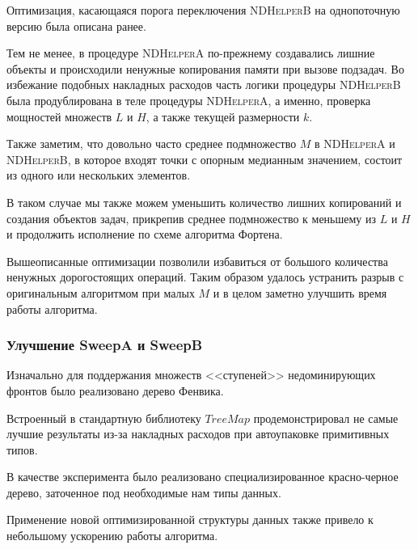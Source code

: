 Оптимизация, касающаяся порога переключения \textsc{NDHelperB} на однопоточную версию была описана ранее.

Тем не менее, в процедуре \textsc{NDHelperA} по-прежнему создавались лишние объекты и происходили ненужные копирования памяти при вызове подзадач.
Во избежание подобных накладных расходов часть логики процедуры \textsc{NDHelperB} была продублирована в теле процедуры \textsc{NDHelperA}, а именно, проверка мощностей множеств $L$ и $H$, а также текущей размерности $k$.

Также заметим, что довольно часто среднее подмножество $M$ в \textsc{NDHelperA} и \textsc{NDHelperB}, в которое входят точки с опорным медианным значением, состоит из одного или нескольких элементов. 

В таком случае мы также можем уменьшить количество лишних копирований и создания объектов задач, прикрепив среднее подмножество к меньшему из $L$ и $H$ и продолжить исполнение по схеме алгоритма Фортена.

Вышеописанные оптимизации позволили избавиться от большого количества ненужных дорогостоящих операций.
Таким образом удалось устранить разрыв с оригинальным алгоритмом при малых $M$ и в целом заметно улучшить время работы алгоритма.

\subsubsection{Улучшение SweepA и SweepB}
Изначально для поддержания множеств <<ступеней>> недоминирующих фронтов было реализовано дерево Фенвика.

Встроенный в стандартную библиотеку $TreeMap$ продемонстрировал не самые лучшие результаты из-за накладных расходов при автоупаковке примитивных типов.

В качестве эксперимента было реализовано специализированное красно-черное дерево, заточенное под необходимые нам типы данных.

Применение новой оптимизированной структуры данных также привело к небольшому ускорению работы алгоритма.


